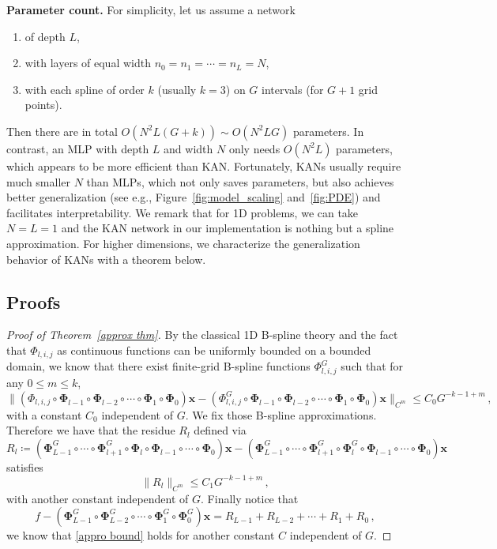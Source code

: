 \documentclass[12pt]{caltech_thesis}
\numberwithin{equation}{section}
\begin{document}
\textbf{Parameter count.} For simplicity, let us assume a network 
\begin{enumerate}[(1)]
    \item of depth $L$,
    \item with layers of equal width $n_0=n_1=\cdots=n_{L}=N$,
    \item with each spline of order $k$ (usually $k=3$) on $G$ intervals (for $G+1$ grid points).
\end{enumerate}
Then there are in total $O(N^2L(G+k))\sim O(N^2LG)$ parameters. In contrast, an MLP with depth $L$ and width $N$ only needs $O(N^2L)$ parameters, which appears to be more efficient than KAN. Fortunately, KANs usually require much smaller $N$ than MLPs, which not only saves parameters, but also achieves better generalization (see e.g., Figure~\ref{fig:model_scaling} and~\ref{fig:PDE}) and facilitates interpretability. 
We remark that for 1D problems, we can take $N=L=1$ and the KAN network in our implementation is nothing but a spline approximation. For higher dimensions, we characterize the generalization behavior of KANs with a theorem below.




\subsection{Proofs}
\label{app:proof}

\begin{proof}[Proof of Theorem~\ref{approx thm}]
    By the classical 1D B-spline theory \cite{de1978practical} and the fact that $\Phi_{l,i,j}$ as continuous functions can be uniformly bounded on a bounded domain, we know that there exist finite-grid B-spline functions $\Phi_{l,i,j}^G$ such that for any $0\leq m\leq k$, $$\|(\Phi_{l,i,j}\circ\mathbf{\Phi}_{l-1}\circ\mathbf{\Phi}_{l-2}\circ\cdots\circ\mathbf{\Phi}_{1}\circ\mathbf{\Phi}_{0})\mathbf{x}-(\Phi_{l,i,j}^G\circ\mathbf{\Phi}_{l-1}\circ\mathbf{\Phi}_{l-2}\circ\cdots\circ\mathbf{\Phi}_{1}\circ\mathbf{\Phi}_{0})\mathbf{x}\|_{C^m}\leq C_0G^{-k-1+m}\,,$$
     with a  constant $C_0$  independent of $G$. We fix those B-spline approximations. Therefore we have  that the residue $R_l$ defined via $$R_l\coloneqq (\mathbf{\Phi}^G_{L-1}\circ\cdots\circ\mathbf{\Phi}^G_{l+1}\circ\mathbf{\Phi}_{l}\circ\mathbf{\Phi}_{l-1}\circ\cdots\circ\mathbf{\Phi}_{0})\mathbf{x}-(\mathbf{\Phi}_{L-1}^G\circ\cdots\circ\mathbf{\Phi}_{l+1}^G\circ\mathbf{\Phi}_{l}^G\circ\mathbf{\Phi}_{l-1}\circ\cdots\circ\mathbf{\Phi}_{0})\mathbf{x}$$
satisfies $$\|R_l\|_{C^m}\leq C_1G^{-k-1+m}\,,$$
with another constant independent of $G$. Finally notice that $$f-(\mathbf{\Phi}^G_{L-1}\circ\mathbf{\Phi}^G_{L-2}\circ\cdots\circ\mathbf{\Phi}^G_{1}\circ\mathbf{\Phi}^G_{0})\mathbf{x}=R_{L-1}+R_{L-2}+\cdots+R_1+R_0\,,$$
we know that \eqref{appro bound} holds for another constant $C$ independent of $G$.
\end{proof}
\end{document}
